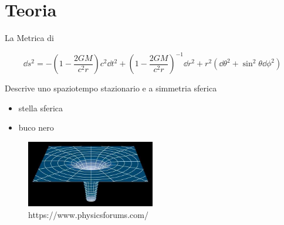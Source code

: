 
\section{Teoria}


\begin{frame}[t]{La Metrica di \Sh}

    \begin{equation*}
        \dd s^2 = - \left( 1 - \frac{2GM}{c^2r} \right) c^2 \dd t^2
        + \left( 1 - \frac{2GM}{c^2r} \right)^{-1} \dd r^2
        + r^2 (\dd \theta^2 + \sin^2 \theta \dd \phi^2)
    \end{equation*}

    Descrive uno spaziotempo stazionario e a simmetria sferica

    \begin{itemize}
        \item stella sferica
        \item buco nero
    \end{itemize}

    \begin{figure}
        \centering
        \includegraphics[width=0.5\textwidth]{Figures/ch1/sh.jpg}
        \caption{https://www.physicsforums.com/}%
    \end{figure}

\end{frame}


